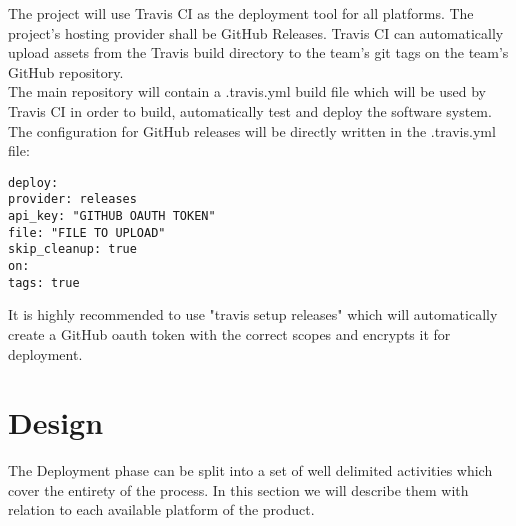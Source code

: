 \documentclass[12pt]{report}
\begin{document}
The project will use Travis CI as the deployment tool for all platforms. The project's hosting provider shall be GitHub Releases. Travis CI can automatically upload assets from the Travis build directory to the team's git tags on the team's GitHub repository. \\
The main repository will contain a .travis.yml build file which will be used by Travis CI in order to build, automatically test and deploy the software system. The configuration for GitHub releases will be directly written in the .travis.yml file: \\
\begin{lstlisting}
deploy:
provider: releases
api_key: "GITHUB OAUTH TOKEN"
file: "FILE TO UPLOAD"
skip_cleanup: true
on:
tags: true
\end{lstlisting}

It is highly recommended to use "travis setup releases" which will automatically create a GitHub oauth token with the correct scopes and encrypts it for deployment.

\section{Design}
The Deployment phase can be split into a set of well delimited activities which cover the entirety of the process. In this section we will describe them with relation to each available platform of the product.
\end{document}
